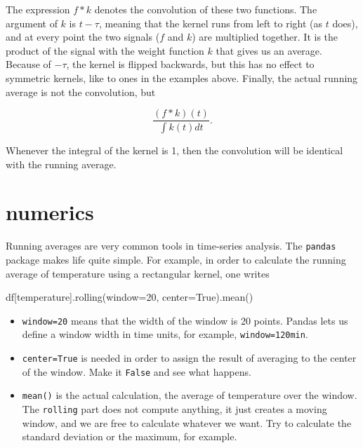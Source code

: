 \documentclass[
  letterpaper,
  DIV=11,
  numbers=noendperiod,
  oneside]{scrreprt}
\newenvironment{Shaded}{\begin{snugshade}}{\end{snugshade}}
\newcommand{\NormalTok}[1]{\textcolor[rgb]{0.00,0.23,0.31}{#1}}
\newcommand{\OperatorTok}[1]{\textcolor[rgb]{0.37,0.37,0.37}{#1}}
\newcommand{\StringTok}[1]{\textcolor[rgb]{0.13,0.47,0.30}{#1}}
\newcommand{\VariableTok}[1]{\textcolor[rgb]{0.07,0.07,0.07}{#1}}
\providecommand{\tightlist}{%
  \setlength{\itemsep}{0pt}\setlength{\parskip}{0pt}}\usepackage{longtable,booktabs,array}
\begin{document}
The expression \(f*k\) denotes the convolution of these two functions.
The argument of \(k\) is \(t-\tau\), meaning that the kernel runs from
left to right (as \(t\) does), and at every point the two signals (\(f\)
and \(k\)) are multiplied together. It is the product of the signal with
the weight function \(k\) that gives us an average. Because of
\(-\tau\), the kernel is flipped backwards, but this has no effect to
symmetric kernels, like to ones in the examples above. Finally, the
actual running average is not the convolution, but

\[
\frac{(f * k)(t)}{\displaystyle \int k(t)dt}.
\]

Whenever the integral of the kernel is 1, then the convolution will be
identical with the running average.

\hypertarget{numerics}{%
\section{numerics}\label{numerics}}

Running averages are very common tools in time-series analysis. The
\texttt{pandas} package makes life quite simple. For example, in order
to calculate the running average of temperature using a rectangular
kernel, one writes

\begin{Shaded}
\begin{Highlighting}[]
\NormalTok{df[}\StringTok{\textquotesingle{}temperature\textquotesingle{}}\NormalTok{].rolling(window}\OperatorTok{=}\StringTok{\textquotesingle{}20\textquotesingle{}}\NormalTok{, center}\OperatorTok{=}\VariableTok{True}\NormalTok{).mean()}
\end{Highlighting}
\end{Shaded}

\begin{itemize}
\tightlist
\item
  \texttt{window=20} means that the width of the window is 20 points.
  Pandas lets us define a window width in time units, for example,
  \texttt{window=\textquotesingle{}120min\textquotesingle{}}.
\item
  \texttt{center=True} is needed in order to assign the result of
  averaging to the center of the window. Make it \texttt{False} and see
  what happens.
\item
  \texttt{mean()} is the actual calculation, the average of temperature
  over the window. The \texttt{rolling} part does not compute anything,
  it just creates a moving window, and we are free to calculate whatever
  we want. Try to calculate the standard deviation or the maximum, for
  example.
\end{itemize}
\end{document}
